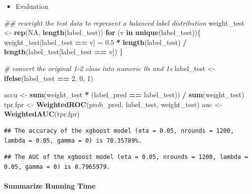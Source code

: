 \documentclass[
]{article}
\newenvironment{Shaded}{\begin{snugshade}}{\end{snugshade}}
\newcommand{\CommentTok}[1]{\textcolor[rgb]{0.56,0.35,0.01}{\textit{#1}}}
\newcommand{\ControlFlowTok}[1]{\textcolor[rgb]{0.13,0.29,0.53}{\textbf{#1}}}
\newcommand{\DecValTok}[1]{\textcolor[rgb]{0.00,0.00,0.81}{#1}}
\newcommand{\FloatTok}[1]{\textcolor[rgb]{0.00,0.00,0.81}{#1}}
\newcommand{\KeywordTok}[1]{\textcolor[rgb]{0.13,0.29,0.53}{\textbf{#1}}}
\newcommand{\NormalTok}[1]{#1}
\newcommand{\OperatorTok}[1]{\textcolor[rgb]{0.81,0.36,0.00}{\textbf{#1}}}
\newcommand{\OtherTok}[1]{\textcolor[rgb]{0.56,0.35,0.01}{#1}}
\newcommand{\StringTok}[1]{\textcolor[rgb]{0.31,0.60,0.02}{#1}}
\providecommand{\tightlist}{%
  \setlength{\itemsep}{0pt}\setlength{\parskip}{0pt}}
\begin{document}
\begin{itemize}
\tightlist
\item
  Evaluation
\end{itemize}

\begin{Shaded}
\begin{Highlighting}[]
\CommentTok{## reweight the test data to represent a balanced label distribution}
\NormalTok{weight_test <-}\StringTok{ }\KeywordTok{rep}\NormalTok{(}\OtherTok{NA}\NormalTok{, }\KeywordTok{length}\NormalTok{(label_test))}
\ControlFlowTok{for}\NormalTok{ (v }\ControlFlowTok{in} \KeywordTok{unique}\NormalTok{(label_test))\{}
\NormalTok{  weight_test[label_test }\OperatorTok{==}\StringTok{ }\NormalTok{v] =}\StringTok{ }\FloatTok{0.5} \OperatorTok{*}\StringTok{ }\KeywordTok{length}\NormalTok{(label_test) }\OperatorTok{/}\StringTok{ }\KeywordTok{length}\NormalTok{(label_test[label_test }\OperatorTok{==}\StringTok{ }\NormalTok{v])}
\NormalTok{\}}

\CommentTok{# convert the original 1-2 class into numeric 0s and 1s}
\NormalTok{label_test <-}\StringTok{ }\KeywordTok{ifelse}\NormalTok{(label_test }\OperatorTok{==}\StringTok{ }\DecValTok{2}\NormalTok{, }\DecValTok{0}\NormalTok{, }\DecValTok{1}\NormalTok{)}

\NormalTok{accu <-}\StringTok{ }\KeywordTok{sum}\NormalTok{(weight_test }\OperatorTok{*}\StringTok{ }\NormalTok{(label_pred }\OperatorTok{==}\StringTok{ }\NormalTok{label_test)) }\OperatorTok{/}\StringTok{ }\KeywordTok{sum}\NormalTok{(weight_test)}
\NormalTok{tpr.fpr <-}\StringTok{ }\KeywordTok{WeightedROC}\NormalTok{(prob_pred, label_test, weight_test)}
\NormalTok{auc <-}\StringTok{ }\KeywordTok{WeightedAUC}\NormalTok{(tpr.fpr)}
\end{Highlighting}
\end{Shaded}

\begin{verbatim}
## The accuracy of the xgboost model (eta = 0.05, nrounds = 1200, lambda = 0.05, gamma = 0) is 70.35789%.
\end{verbatim}

\begin{verbatim}
## The AUC of the xgboost model (eta = 0.05, nrounds = 1200, lambda = 0.05, gamma = 0) is 0.7965979.
\end{verbatim}

\hypertarget{summarize-running-time-1}{%
\paragraph{Summarize Running Time}\label{summarize-running-time-1}}
\end{document}
